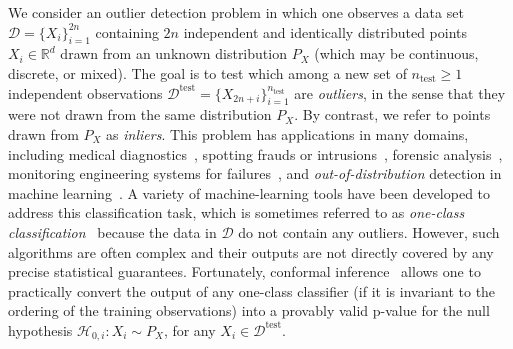 \documentclass[11pt]{article}
\begin{document}
We consider an outlier detection problem in which one observes a data set $\mathcal{D}=\{X_i\}_{i=1}^{2n}$ containing $2n$ independent and identically distributed points $X_i \in \mathbb{R}^{d}$ drawn from an unknown distribution $P_{X}$ {(which may be continuous, discrete, or mixed)}.
The goal is to test which among a new set of $n_{\text{test}} \geq 1$ independent observations $\mathcal{D}^{\mathrm{test}} = \{X_{2n+i}\}_{i=1}^{n_{\text{test}}}$ are \emph{outliers}, in the sense that they were not drawn from the same distribution $P_{X}$. By contrast, we refer to points drawn from $P_X$ as \emph{inliers}.
This problem has applications in many domains, including medical diagnostics~\cite{tarassenko1995novelty}, spotting frauds or intrusions~\cite{patcha2007overview}, forensic analysis~\cite{Fortunato2020}, monitoring engineering systems for failures~\cite{Tarassenko2009},
and \emph{out-of-distribution} detection in machine learning~\cite{hendrycks2016baseline, liang2017enhancing, lee2018simple, lee2018training}.
A variety of machine-learning tools have been developed to address this classification task, which is sometimes referred to as \emph{one-class classification}~\cite{moya1993one,pimentel2014review} because the data in $\mathcal{D}$ do not contain any outliers. 
However, such algorithms are often complex and their outputs are not directly covered by any precise statistical guarantees. Fortunately, {conformal} inference~\cite{vovk1999machine, vovk2005algorithmic} allows one to practically convert the output {of any} one-class classifier ({if} it is invariant to the ordering of the training observations) into a provably valid p-value for the null hypothesis $\mathcal{H}_{0,i}: X_{i} \sim P_X$, for any $X_i \in \mathcal{D}^{\mathrm{test}}$. 
\end{document}
